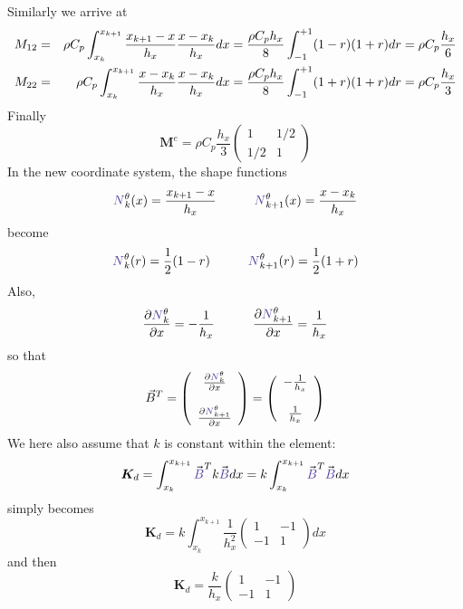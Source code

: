 Similarly we arrive at 
\begin{eqnarray}
M_{12}
&=&\rho C_p 
\int_{x_k}^{x_{k+1}} 
\frac{x_{k+1}-x}{h_x}  
\frac{x-x_k}{h_x}  
dx
=
\frac{\rho C_p  h_x}{8} 
\int_{-1}^{+1} (1-r) (1+r)dr
= \rho C_p\frac{h_x}{6}  \nonumber\\
M_{22}
&=&
\rho C_p 
\int_{x_k}^{x_{k+1}} 
\frac{x-x_k}{h_x}  
\frac{x-x_k}{h_x}  
dx
=
\frac{\rho C_p  h_x}{8} 
\int_{-1}^{+1} (1+r) (1+r)dr
= \rho C_p \frac{h_x}{3} \nonumber 
\end{eqnarray}
Finally 
\[
\boxed{
{\bm M}^e= \rho C_p \frac{h_x}{3}   
\left(
\begin{array}{cc}
1  & 1/2 \\
1/2 & 1
\end{array}
\right)
}
\]
In the new coordinate system, the {\color{olive}shape functions} 
\[
{\color{Violet}N}_k^\theta(x) = \frac{x_{k+1}-x}{h_x} 
\quad
\quad
\quad
{\color{Violet}N}_{k+1}^\theta(x) = \frac{x-x_k}{h_x} 
\]
become 
\[
{\color{Violet}N}_k^\theta(r) = \frac{1}{2} (1-r)
\quad
\quad
\quad
{\color{Violet}N}_{k+1}^\theta(r) = \frac{1}{2} (1+r)
\]
Also, 
\[
\frac{\partial {\color{Violet}N}_k^\theta}{\partial x} = - \frac{1}{h_x} 
\quad
\quad
\quad
\frac{\partial {\color{Violet}N}_{k+1}^\theta}{\partial x} = \frac{1}{h_x} 
\]
so that 
\[
{\vec B}^T=
\left(
\begin{array}{cc}
 \frac{\partial {\color{Violet}N}_k^\theta}{\partial x}   \\ \\
 \frac{\partial {\color{Violet}N}_{k+1}^\theta}{\partial x}
\end{array}
\right)
=
\left(
\begin{array}{cc}
-\frac{1}{h_x} \\ \\
\frac{1}{h_x} 
\end{array}
\right)
\]
We here also assume that $k$ is constant within the element:
\[
{\bm K}_d =
\int_{x_k}^{x_{k+1}}   {\vec {\color{Violet}B}}^T k {\vec {\color{Violet}B}} dx 
= k \int_{x_k}^{x_{k+1}}   {\vec {\color{Violet}B}}^T {\vec {\color{Violet}B}} dx 
\]
simply becomes
\[
{\bm K}_d = k
 \int_{x_k}^{x_{k+1}} 
\frac{1}{h_x^2}
\left(
\begin{array}{cc}
1 & -1 \\ -1 & 1
\end{array}
\right)
dx
\]
and then
\[
\boxed{
{\bm K}_d =
\frac{k}{h_x}
\left(
\begin{array}{cc}
1 & -1 \\ -1 & 1
\end{array}
\right)
}
\]

